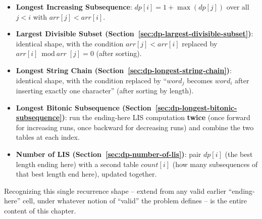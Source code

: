 \begin{patternbox}
\begin{itemize}
  \item \textbf{Longest Increasing Subsequence}: $\textit{dp}[i] = 1 +
        \max(\textit{dp}[j])$ over all $j<i$ with
        $\textit{arr}[j] < \textit{arr}[i]$.
  \item \textbf{Largest Divisible Subset (Section~\ref{sec:dp-largest-divisible-subset})}:
        identical shape, with the condition $\textit{arr}[j] <
        \textit{arr}[i]$ replaced by $\textit{arr}[i] \bmod
        \textit{arr}[j] = 0$ (after sorting).
  \item \textbf{Longest String Chain (Section~\ref{sec:dp-longest-string-chain})}:
        identical shape, with the condition replaced by ``$\textit{word}_j$
        becomes $\textit{word}_i$ after inserting exactly one
        character'' (after sorting by length).
  \item \textbf{Longest Bitonic Subsequence (Section~\ref{sec:dp-longest-bitonic-subsequence})}:
        run the ending-here LIS computation \textbf{twice} (once
        forward for increasing runs, once backward for decreasing
        runs) and combine the two tables at each index.
  \item \textbf{Number of LIS (Section~\ref{sec:dp-number-of-lis})}: pair
        $\textit{dp}[i]$ (the best length ending here) with a second
        table $\textit{count}[i]$ (how many subsequences of that best
        length end here), updated together.
\end{itemize}
Recognizing this single recurrence shape -- extend from any valid
earlier ``ending-here'' cell, under whatever notion of ``valid'' the
problem defines -- is the entire content of this chapter.
\end{patternbox}

\newpage








